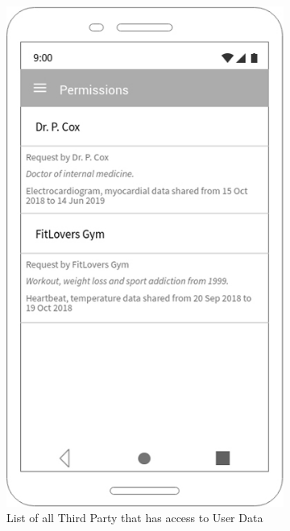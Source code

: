 \begin{figure}[h!]
 \centering
  \begin{subfigure}[b]{0.4\linewidth}
    \includegraphics[width=\linewidth]{img/mockup/u_permissions.jpg}
    \caption{List of all Third Party that has access to User Data}
  \end{subfigure}
 ~ ~ ~ ~ ~ ~ 
  \begin{subfigure}[b]{0.4\linewidth}

\end{subfigure}
\end{figure}
